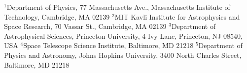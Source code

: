 {\tiny\noindent
$^1$Department of Physics, 77 Massachusetts Ave., Massachusetts 
Institute of Technology, Cambridge, MA 02139\newline
\noindent$^2$MIT Kavli Institute for Astrophysics and Space Research, 70 Vassar
St., Cambridge, MA 02139\newline
\noindent$^3$Department of Astrophysical Sciences, Princeton University, 4 Ivy 
Lane, Princeton, NJ 08540, USA\newline	
\noindent$^4$Space Telescope Science Institute, Baltimore, MD 21218\newline
\vspace{-0.222cm}
\noindent$^5$Department of Physics and Astronomy, Johns 
Hopkins University, 3400 North Charles Street, Baltimore, MD 21218
}